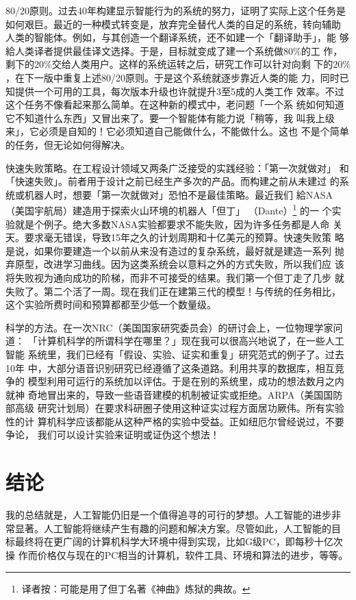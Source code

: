 \documentclass[12pt,a4paper]{article}
\begin{document}
80/20原则。过去40年构建显示智能行为的系统的努力，证明了实际上这个任务是
如何艰巨。最近的一种模式转变是，放弃完全替代人类的自足的系统，转向辅助
人类的智能体。例如，与其创造一个翻译系统，还不如建一个「翻译助手」，能
够給人类译者提供最佳译文选择。于是，目标就变成了建一个系统做$80\%$的工
作，剩下的$20\%$交给人类用户。这样的系统运转之后，研究工作可以针对向剩
下的$20\%$，在下一版中重复上述80/20原则。于是这个系统就逐步靠近人类的能
力，同时已知提供一个可用的工具，每次版本升级也许就提升3至5成的人类工作
效率。不过这个任务不像看起来那么简单。在这种新的模式中，老问题「一个系
统如何知道它不知道什么东西」又冒出来了。要一个智能体有能力说「稍等，我
叫我上级来」，它必须是自知的！它必须知道自己能做什么，不能做什么。这也
不是个简单的任务，但无论如何得解决。

快速失败策略。在工程设计领域又两条广泛接受的实践经验：「第一次就做对」
和「快速失败」。前者用于设计之前已经生产多次的产品。而构建之前从未建过
的系统或机器人时，想要「第一次就做对」恐怕不是最佳策略。最近我们
給NASA（美国宇航局）建造用于探索火山环境的机器人「但丁」
（Dante）\footnote{译者按：可能是用了但丁名著《神曲》炼狱的典故。} 的一
个实验就是个例子。绝大多数NASA实验都要求不能失败，因为许多任务都是人命
关天。要求毫无错误，导致15年之久的计划周期和十亿美元的预算。快速失败策
略是说，如果你要建造一个以前从来没有造过的复杂系统，最好就是建造一系列
抛弃原型，改进学习曲线。因为这类系统会以意料之外的方式失败，所以我们应
该将失败视为通向成功的阶梯，而非不可接受的结果。我们第一个但丁走了几步
就失败了。第二个活了一周。现在我们正在建第三代的模型！与传统的任务相比，
这个实验所费时间和预算都都至少低一个数量级。

科学的方法。在一次NRC（美国国家研究委员会）的研讨会上，一位物理学家问道：
「计算机科学的所谓科学在哪里？」现在我可以很高兴地说了，在一些人工智能
系统里，我们已经有「假设、实验、证实和重复」研究范式的例子了。过去10年
中，大部分语音识别研究已经遵循了这条道路。利用共享的数据库，相互竞争的
模型利用可运行的系统加以评估。于是在别的系统里，成功的想法数月之内就神
奇地冒出来的，导致一些语音建模的机制被证实或拒绝。ARPA（美国国防部高级
研究计划局）在要求科研圈子使用这种证实过程方面居功厥伟。所有实验性的计
算机科学应该都能从这种严格的实验中受益。正如纽厄尔曾经说过，不要争论，
我们可以设计实验来证明或证伪这个想法！

\section{结论}

我的总结就是，人工智能仍旧是一个值得追寻的可行的梦想。人工智能的进步非
常显著。人工智能将继续产生有趣的问题和解决方案。尽管如此，人工智能的目
标最终将在更广阔的计算机科学大环境中得到实现，比如G级PC，即每秒十亿次操
作而价格仅与现在的PC相当的计算机，软件工具、环境和算法的进步，等等。
\end{document}
